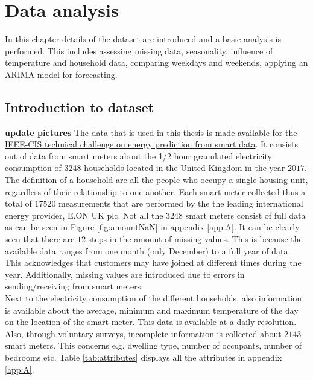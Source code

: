 \chapter{Data analysis}
\label{cha:1}
In this chapter details of the dataset are introduced and a basic analysis is performed. This includes assessing missing data, seasonality,  influence of temperature and household data, comparing weekdays and weekends, applying an ARIMA model for forecasting.


\section{Introduction to dataset}
\textbf{update pictures}
The data that is used in this thesis is made available for the \href{https://ieee-dataport.org/competitions/ieee-cis-technical-challenge-energy-prediction-smart-meter-data}{IEEE-CIS technical challenge on energy prediction from smart data}. It consists out of data from smart meters about the 1/2 hour granulated electricity consumption of $3248$ households located in the United Kingdom in the year $2017$. The definition of a household are all the people who occupy a single housing unit, regardless of their relationship to one another. Each smart meter collected thus a total of $17520$ measurements that are performed by the the leading international energy provider, E.ON UK plc. Not all the $3248$ smart meters consist of full data as can be seen in Figure \ref{fig:amountNaN} in appendix \ref{app:A}. It can be clearly seen that there are $12$ steps in the amount of missing values. This is because the available data ranges from one month (only December) to a full year of data. This acknowledges that customers may have joined at different times during the year. Additionally, missing values are introduced due to errors in sending/receiving from smart meters.\\
Next to the electricity consumption of the different households, also information is available about the average, minimum and maximum temperature of the day on the location of the smart meter. This data is available at a daily resolution. Also, through voluntary surveys, incomplete information is collected about $2143$ smart meters. This concerns e.g. dwelling type, number of occupants, number of bedrooms etc. Table \ref{tab:attributes} displays all the attributes in appendix \ref{app:A}.\\

